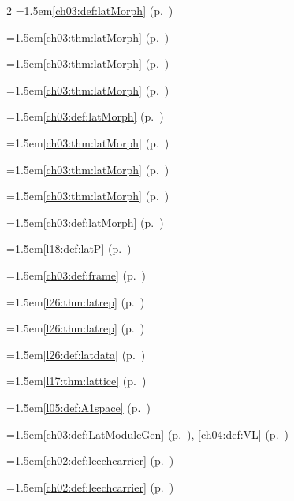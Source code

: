 \begin{multicols}{2}
\hangindent=1.5em\quad \ref{ch03:def:latMorph} (p.~\pageref{ch03:def:latMorph})\par
\hangindent=1.5em\quad \ref{ch03:thm:latMorph} (p.~\pageref{ch03:thm:latMorph})\par
\hangindent=1.5em\quad \ref{ch03:thm:latMorph} (p.~\pageref{ch03:thm:latMorph})\par
\hangindent=1.5em\quad \ref{ch03:thm:latMorph} (p.~\pageref{ch03:thm:latMorph})\par
\hangindent=1.5em\quad \ref{ch03:def:latMorph} (p.~\pageref{ch03:def:latMorph})\par
\hangindent=1.5em\quad \ref{ch03:thm:latMorph} (p.~\pageref{ch03:thm:latMorph})\par
\hangindent=1.5em\quad \ref{ch03:thm:latMorph} (p.~\pageref{ch03:thm:latMorph})\par
\hangindent=1.5em\quad \ref{ch03:thm:latMorph} (p.~\pageref{ch03:thm:latMorph})\par
\hangindent=1.5em\quad \ref{ch03:def:latMorph} (p.~\pageref{ch03:def:latMorph})\par
\hangindent=1.5em\quad \ref{l18:def:latP} (p.~\pageref{l18:def:latP})\par
\hangindent=1.5em\quad \ref{ch03:def:frame} (p.~\pageref{ch03:def:frame})\par
\hangindent=1.5em\quad \ref{l26:thm:latrep} (p.~\pageref{l26:thm:latrep})\par
\hangindent=1.5em\quad \ref{l26:thm:latrep} (p.~\pageref{l26:thm:latrep})\par
\hangindent=1.5em\quad \ref{l26:def:latdata} (p.~\pageref{l26:def:latdata})\par
\hangindent=1.5em\quad \ref{l17:thm:lattice} (p.~\pageref{l17:thm:lattice})\par
\hangindent=1.5em\quad \ref{l05:def:A1space} (p.~\pageref{l05:def:A1space})\par
\hangindent=1.5em\quad \ref{ch03:def:LatModuleGen} (p.~\pageref{ch03:def:LatModuleGen}), \ref{ch04:def:VL} (p.~\pageref{ch04:def:VL})\par
\hangindent=1.5em\quad \ref{ch02:def:leechcarrier} (p.~\pageref{ch02:def:leechcarrier})\par
\hangindent=1.5em\quad \ref{ch02:def:leechcarrier} (p.~\pageref{ch02:def:leechcarrier})\par

\end{multicols}
